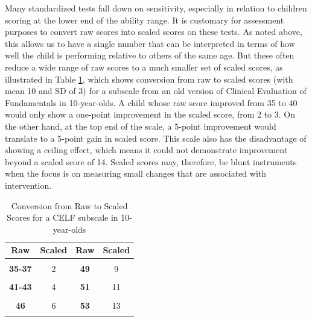 \documentclass{krantz}
\begin{document}
Many standardized tests fall down on sensitivity, especially in relation to children scoring at the lower end of the ability range. It is customary for assessment purposes to convert raw scores into scaled scores on these tests. As noted above, this allows us to have a single number that can be interpreted in terms of how well the child is performing relative to others of the same age. But these often reduce a wide range of raw scores to a much smaller set of scaled scores, as illustrated in Table \ref{tab:celfexample}, which shows conversion from raw to scaled scores (with mean 10 and SD of 3) for a subscale from an old version of Clinical Evaluation of Fundamentals in 10-year-olds. A child whose raw score improved from 35 to 40 would only show a one-point improvement in the scaled score, from 2 to 3. On the other hand, at the top end of the scale, a 5-point improvement would translate to a 5-point gain in scaled score. This scale also has the disadvantage of showing a ceiling effect, which means it could not demonstrate improvement beyond a scaled score of 14. Scaled scores may, therefore, be blunt instruments when the focus is on measuring small changes that are associated with intervention.

\begin{table}

\caption{\label{tab:celfexample}Conversion from Raw to Scaled Scores for a CELF subscale in 10-year-olds}
\centering
\begin{tabular}[t]{>{}cc>{}cc}
\toprule
Raw & Scaled & Raw & Scaled\\
\midrule
\textbf{\cellcolor{gray!6}{0-34}} & \cellcolor{gray!6}{1} & \textbf{\cellcolor{gray!6}{48}} & \cellcolor{gray!6}{8}\\
\textbf{35-37} & 2 & \textbf{49} & 9\\
\textbf{\cellcolor{gray!6}{38-40}} & \cellcolor{gray!6}{3} & \textbf{\cellcolor{gray!6}{50}} & \cellcolor{gray!6}{10}\\
\textbf{41-43} & 4 & \textbf{51} & 11\\
\textbf{\cellcolor{gray!6}{44-45}} & \cellcolor{gray!6}{5} & \textbf{\cellcolor{gray!6}{52}} & \cellcolor{gray!6}{12}\\
\addlinespace
\textbf{46} & 6 & \textbf{53} & 13\\
\textbf{\cellcolor{gray!6}{47}} & \cellcolor{gray!6}{7} & \textbf{\cellcolor{gray!6}{54}} & \cellcolor{gray!6}{14}\\
\bottomrule
\end{tabular}
\end{table}
\end{document}

